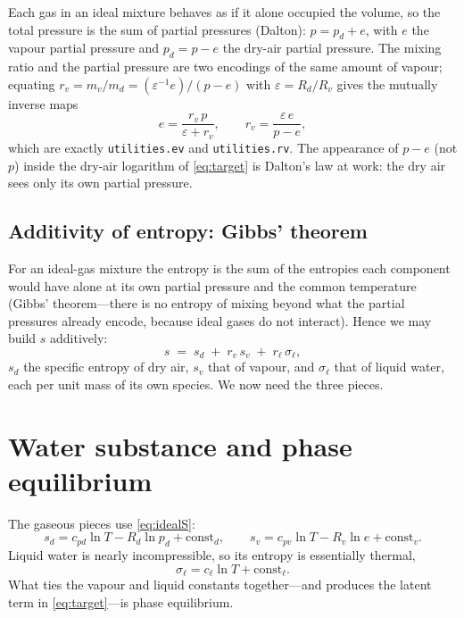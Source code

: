 \documentclass[11pt,a4paper]{article}
\theoremstyle{definition}
\newcommand{\Rd}{R_d}
\newcommand{\Rv}{R_v}
\newcommand{\cpd}{c_{pd}}
\newcommand{\cpv}{c_{pv}}
\newcommand{\cl}{c_\ell}
\newcommand{\rvv}{r_v}
\newcommand{\rl}{r_\ell}
\newcommand{\pd}{p_d}
\newcommand{\eps}{\varepsilon}
\begin{document}
Each gas in an ideal mixture behaves as if it alone occupied the volume, so the
total pressure is the sum of partial pressures (Dalton): $p=\pd+e$, with $e$
the vapour partial pressure and $\pd=p-e$ the dry-air partial pressure. The
mixing ratio and the partial pressure are two encodings of the same amount of
vapour; equating $\rvv=m_v/m_d=(\eps^{-1}e)/(p-e)$ with $\eps=\Rd/\Rv$ gives the
mutually inverse maps
\begin{equation}\label{eq:evrv}
e=\frac{\rvv\,p}{\eps+\rvv},\qquad
\rvv=\frac{\eps\,e}{p-e},
\end{equation}
which are exactly \texttt{utilities.ev} and \texttt{utilities.rv}. The
appearance of $p-e$ (not $p$) inside the dry-air logarithm of \eqref{eq:target}
is Dalton's law at work: the dry air sees only its own partial pressure.

\subsection{Additivity of entropy: Gibbs' theorem}

For an ideal-gas mixture the entropy is the sum of the entropies each component
would have alone at its own partial pressure and the common temperature
(Gibbs' theorem---there is no entropy of mixing beyond what the partial
pressures already encode, because ideal gases do not interact). Hence we may
build $s$ additively:
\begin{equation}\label{eq:additive}
s \;=\; s_d \;+\; \rvv\, s_v \;+\; \rl\, \sigma_\ell,
\end{equation}
$s_d$ the specific entropy of dry air, $s_v$ that of vapour, and $\sigma_\ell$
that of liquid water, each per unit mass of its own species. We now need the
three pieces.

\section{Water substance and phase equilibrium}\label{sec:phase}

The gaseous pieces use \eqref{eq:idealS}:
\begin{equation}\label{eq:sd-sv}
s_d = \cpd\ln T - \Rd\ln \pd + \mathrm{const}_d,\qquad
s_v = \cpv\ln T - \Rv\ln e + \mathrm{const}_v.
\end{equation}
Liquid water is nearly incompressible, so its entropy is essentially thermal,
\begin{equation}\label{eq:sl}
\sigma_\ell = \cl\ln T + \mathrm{const}_\ell .
\end{equation}
What ties the vapour and liquid constants together---and produces the latent
term in \eqref{eq:target}---is phase equilibrium.
\end{document}

